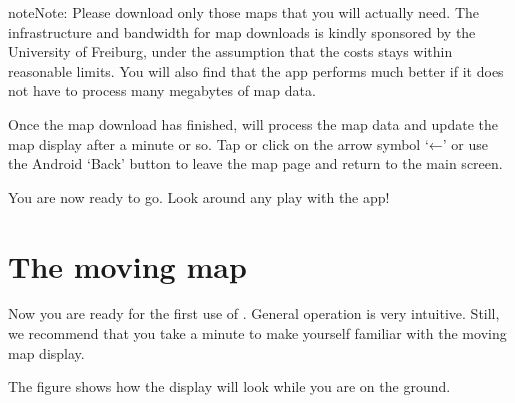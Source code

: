 \documentclass[letterpaper,10pt,english]{sphinxmanual}
\begin{document}
\begin{sphinxadmonition}{note}{Note:}
\sphinxAtStartPar
Please download only those maps that you will actually need.  The
infrastructure and bandwidth for map downloads is kindly sponsored by the
University of Freiburg, under the assumption that the costs stays within
reasonable limits.  You will also find that the app performs much better if
it does not have to process many megabytes of map data.
\end{sphinxadmonition}

\sphinxAtStartPar
Once the map download has finished,  will process
the map data and update the map display after a minute or so.  Tap or click on
the arrow symbol ‘←’ or use the Android ‘Back’ button to leave the map page and
return to the main screen.

\sphinxAtStartPar
You are now ready to go.  Look around any play with the app!


\section{The moving map}
\label{\detokenize{01-intro/02-getting_started:the-moving-map}}
\sphinxAtStartPar
Now you are ready for the first use of .  General
operation is very intuitive.  Still, we recommend that you take a minute to make
yourself familiar with the moving map display.

\sphinxAtStartPar
{}

\sphinxAtStartPar
The figure {\hyperref[\detokenize{01-intro/02-getting_started:movingmapgroundmode}]{}} shows how the display will look while you
are on the ground.
\end{document}
